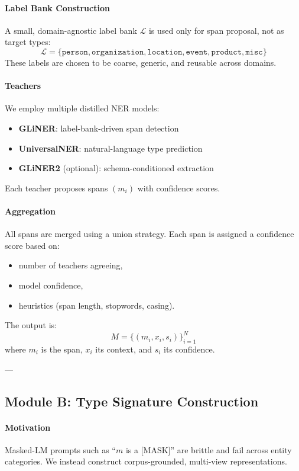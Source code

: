 \documentclass[14pt]{extreport}
\begin{document}
\paragraph{Label Bank Construction}
A small, domain-agnostic label bank $\mathcal{L}$ is used only for span proposal, not as target types:
\[
\mathcal{L} = \{\texttt{person}, \texttt{organization}, \texttt{location}, \texttt{event}, \texttt{product}, \texttt{misc}\}
\]
These labels are chosen to be coarse, generic, and reusable across domains.

\paragraph{Teachers}
We employ multiple distilled NER models:
\begin{itemize}
    \item \textbf{GLiNER}: label-bank-driven span detection
    \item \textbf{UniversalNER}: natural-language type prediction
    \item \textbf{GLiNER2} (optional): schema-conditioned extraction
\end{itemize}

Each teacher proposes spans $(m_i)$ with confidence scores.

\paragraph{Aggregation}
All spans are merged using a union strategy. Each span is assigned a confidence score based on:
\begin{itemize}
    \item number of teachers agreeing,
    \item model confidence,
    \item heuristics (span length, stopwords, casing).
\end{itemize}

The output is:
\[
M = \{(m_i, x_i, s_i)\}_{i=1}^N
\]
where $m_i$ is the span, $x_i$ its context, and $s_i$ its confidence.

---

\subsection{Module B: Type Signature Construction}

\paragraph{Motivation}
Masked-LM prompts such as ``$m$ is a [MASK]'' are brittle and fail across entity categories.
We instead construct corpus-grounded, multi-view representations.
\end{document}
